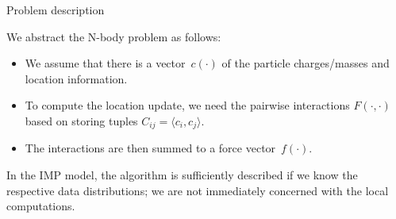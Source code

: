 
\begin{comment}
\Level 0 {Analysis}

The full $N$-body problem entails computing the mutual interactions
between $N$ particles, giving $N^2$ operations. 
A~straightforward parallelization is based on distributing the particles
over the processors.
The communication cost
of this is
\begin{itemize}
\item $O(P)$ latency since messages need to be received from all processors.
\item $O(N)$ bandwidth, since all particles need to be received.
\end{itemize}
If we however distribute the force calculations, rather than the particles,
we come to different bounds; see~\cite{Driscoll:optimal-nbody} and
references cited therein.

With every processor computing the interactions in a block with sides $N/\sqrt P$, 
there is replication of particles and forces need to be collected.
Thus, the cost is now
\begin{itemize}
\item $O(\log p)$ latency for the broadcast and reduction
\item $O(N/\sqrt P\cdot \log P)$ bandwidth, since that is how much
  force data each processor contributes to the final sum.
\begin{impquestion}
  (That
  Driscoll reference does not have the $\log P$ term. Not sure how
  they can lose that.)
\end{impquestion}
\end{itemize}
\end{comment}

 {Problem description}

We abstract the N-body problem as follows:
\begin{itemize}
\item We assume that there is a vector~$c(\cdot)$
  of the particle charges/masses and location information. 
\item To compute the location update, we need the pairwise
  interactions $F(\cdot,\cdot)$ based on storing tuples
  $C_{ij}=\langle c_i,c_j\rangle$.
\item The interactions are then summed to a force vector~$f(\cdot)$.
\end{itemize}
In the \ac{IMP} model, the algorithm is sufficiently described 
if we know the respective data distributions; we are not immediately concerned with the 
local computations.

